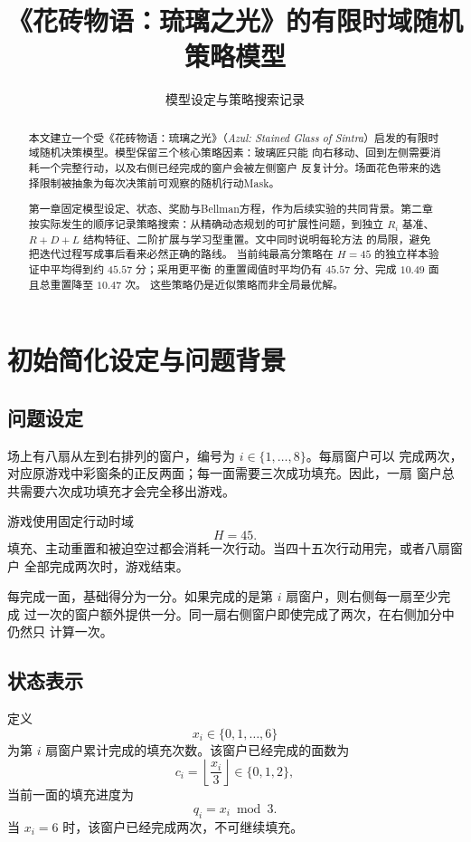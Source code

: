 \documentclass[UTF8,11pt,openany]{ctexrep}
\title{《花砖物语：琉璃之光》的有限时域随机策略模型}
\author{}
\date{模型设定与策略搜索记录}
\begin{document}
\maketitle

\begin{abstract}
本文建立一个受《花砖物语：琉璃之光》（\textit{Azul: Stained Glass of
Sintra}）启发的有限时域随机决策模型。模型保留三个核心策略因素：玻璃匠只能
向右移动、回到左侧需要消耗一个完整行动，以及右侧已经完成的窗户会被左侧窗户
反复计分。场面花色带来的选择限制被抽象为每次决策前可观察的随机行动Mask。

第一章固定模型设定、状态、奖励与Bellman方程，作为后续实验的共同背景。第二章
按实际发生的顺序记录策略搜索：从精确动态规划的可扩展性问题，到独立
$R_i$ 基准、$R+D+L$ 结构特征、二阶扩展与学习型重置。文中同时说明每轮方法
的局限，避免把迭代过程写成事后看来必然正确的路线。
当前纯最高分策略在 $H=45$ 的独立样本验证中平均得到约 $45.57$ 分；采用更平衡
的重置阈值时平均仍有 $45.57$ 分、完成 $10.49$ 面且总重置降至 $10.47$ 次。
这些策略仍是近似策略而非全局最优解。
\end{abstract}

\tableofcontents

\chapter{初始简化设定与问题背景}

\section{问题设定}

场上有八扇从左到右排列的窗户，编号为 $i\in\{1,\ldots,8\}$。每扇窗户可以
完成两次，对应原游戏中彩窗条的正反两面；每一面需要三次成功填充。因此，一扇
窗户总共需要六次成功填充才会完全移出游戏。

游戏使用固定行动时域
\[
H=45.
\]
填充、主动重置和被迫空过都会消耗一次行动。当四十五次行动用完，或者八扇窗户
全部完成两次时，游戏结束。

每完成一面，基础得分为一分。如果完成的是第 $i$ 扇窗户，则右侧每一扇至少完成
过一次的窗户额外提供一分。同一扇右侧窗户即使完成了两次，在右侧加分中仍然只
计算一次。

\section{状态表示}

定义
\[
x_i\in\{0,1,\ldots,6\}
\]
为第 $i$ 扇窗户累计完成的填充次数。该窗户已经完成的面数为
\[
c_i=\left\lfloor\frac{x_i}{3}\right\rfloor\in\{0,1,2\},
\]
当前一面的填充进度为
\[
q_i=x_i\bmod 3.
\]
当 $x_i=6$ 时，该窗户已经完成两次，不可继续填充。
\end{document}
